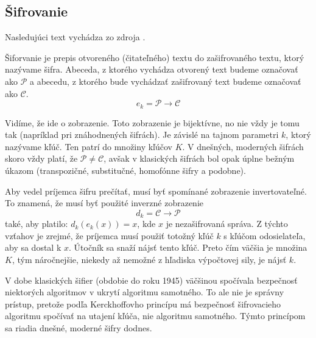 \subsection{Šifrovanie}
\noindent Nasledujúci text vychádza zo zdroja \cite{8}. 
\par Šiforvanie je prepis otvoreného (čitateľného) textu do zašifrovaného textu, ktorý nazývame šifra. Abeceda, z ktorého vychádza otvorený text budeme označovať ako $\mathcal{P}$ a abecedu, z ktorého bude vychádzať zašifrovaný text budeme označovať ako $\mathcal{C}$.
\begin{equation}
e_k = \mathcal{P} \rightarrow \mathcal{C}
\end{equation}
\par Vidíme, že ide o zobrazenie. Toto zobrazenie je bijektívne, no nie vždy je tomu tak (napríklad pri znáhodnených šifrách). Je závislé na tajnom parametri $k$, ktorý nazývame kľúč. Ten patrí do množiny kľúčov $K$. V dnešných, moderných šifrách skoro vždy platí, že $\mathcal{P} \neq \mathcal{C}$, avšak v klasických šifrách bol opak úplne bežným úkazom (transpozičné, substitučné, homofónne šifry a podobne).
\par Aby vedel príjemca šifru prečítať, musí byť spomínané zobrazenie invertovateľné. To znamená, že musí byť použité inverzné zobrazenie 
\begin{equation}
d_k = \mathcal{C} \rightarrow \mathcal{P}
\end{equation}
také, aby platilo: $d_k(e_k(x)) = x$, kde $x$ je nezašifrovaná správa. Z týchto vzťahov je zrejmé, že príjemca musí použiť totožný kľúč $k$ s kľúčom odosielateľa, aby sa dostal k $x$. Útočník sa snaží nájsť tento kľúč. Preto čím väčšia je množina $K$, tým náročnejšie, niekedy až nemožné z hľadiska výpočtovej sily, je nájsť $k$.
\par V dobe klasických šifier (obdobie do roku 1945) väčšinou spočívala bezpečnosť niektorých algoritmov v ukrytí algoritmu samotného. To ale nie je správny prístup, pretože podľa Kerckhoffovho princípu \cite{9} má bezpečnosť šifrovacieho algoritmu spočívať na utajení kľúča, nie algoritmu samotného. Týmto princípom sa riadia dnešné, moderné šifry dodnes. 